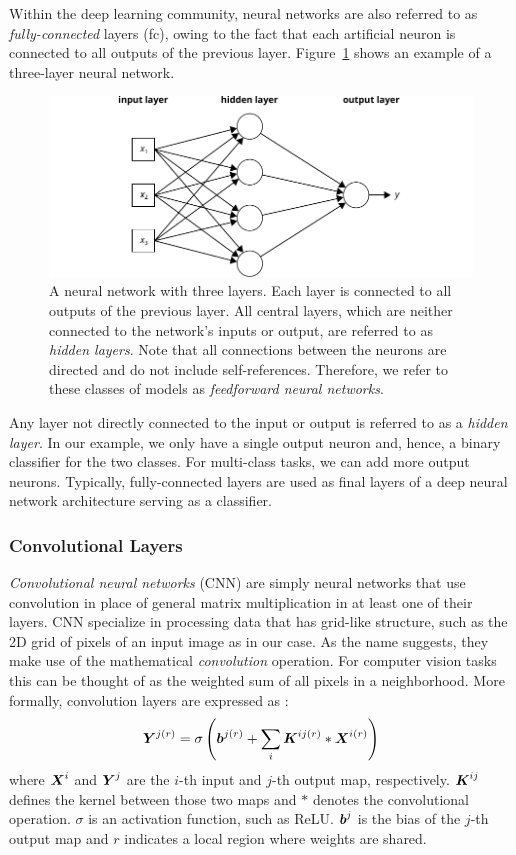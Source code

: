 Within the deep learning community, neural networks are also referred to as \emph{fully-connected} layers (\ac{fc}), owing to the fact that each artificial neuron is connected to all outputs of the previous layer. Figure~\ref{fig:nn} shows an example of a three-layer neural network.
%
	\begin{figure}[tp]
  		\centering
    	\includegraphics{img/nn.pdf}
    	\caption{A neural network with three layers. Each layer is connected to all outputs of the previous layer. All central layers, which are neither connected to the network's inputs or output, are referred to as \emph{hidden layers}. Note that all connections between the neurons are directed and do not include self-references. Therefore, we refer to these classes of models as \emph{feedforward neural networks}.}
    	\label{fig:nn}
	\end{figure}
%
Any layer not directly connected to the input or output is referred to as a \emph{hidden layer}. In our example, we only have a single output neuron and, hence, a binary classifier for the two classes. For multi-class tasks, we can add more output neurons. Typically, fully-connected layers are used as final layers of a deep neural network architecture serving as a classifier.

\subsubsection{Convolutional Layers}
\emph{Convolutional neural networks} (CNN) are simply neural networks that use convolution in place of general matrix multiplication in at least one of their layers. CNN specialize in processing data that has grid-like structure, such as the 2D grid of pixels of an input image as in our case. As the name suggests, they make use of the mathematical \emph{convolution} operation. For computer vision tasks this can be thought of as the weighted sum of all pixels in a neighborhood. More formally, convolution layers are expressed as \cite{sun2014deep}: 
%
$$
\boldsymbol{Y}^{j(r)} = \sigma \left( \boldsymbol{b}^{j(r)} + \sum_i \boldsymbol{K}^{ij(r)} \ast \boldsymbol{X}^{i(r)} \right)
$$
%
where $\boldsymbol{X}^i$ and $\boldsymbol{Y}^j$ are the $i$-th input and $j$-th output map, respectively. $\boldsymbol{K}^{ij}$ defines the kernel between those two maps and $\ast$ denotes the convolutional operation. $\sigma$ is an activation function, such as ReLU. $\boldsymbol{b}^j$ is the bias of the $j$-th output map and $r$ indicates a local region where weights are shared.

